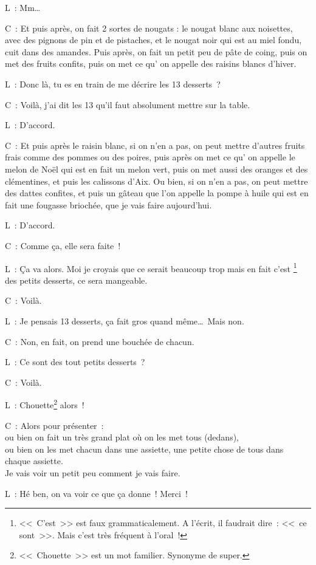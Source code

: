 \documentclass[11pt, french]{report}
\begin{document}
L~: Mm\ldots

C~: Et puis après, on fait 2 sortes de nougats : le nougat blanc aux noisettes,
avec des pignons de pin et de pistaches, et le nougat noir qui est au miel
fondu, cuit dans des amandes. Puis après, on fait un petit peu de pâte de
coing, puis on met des fruits confits, puis on met ce qu’ on appelle des
raisins blancs d’hiver.

L~: Donc là, tu es en train de me décrire les 13 desserts~?

C~: Voilà, j’ai dit les 13 qu’il faut absolument mettre sur la table.

L~: D’accord.

C~: Et puis après le raisin blanc, si on n’en a pas, on peut mettre d’autres
fruits frais comme des pommes ou des poires, puis après on met ce qu’ on
appelle le melon de Noël qui est en fait un melon vert, puis on met aussi des
oranges et des clémentines, et puis les calissons d’Aix. Ou bien, si on n’en
a pas, on peut mettre des dattes confites, et puis un gâteau que l’on appelle
la pompe à huile qui est en fait une fougasse briochée, que je vais faire
aujourd’hui.

L~: D’accord.

C~: Comme ça, elle sera faite~!

L~: Ça va alors. Moi je croyais que ce serait beaucoup trop mais en fait c’est
\footnote{<<~C'est~>> est faux grammaticalement. A l'écrit, il faudrait dire~:
  <<~ce sont~>>. Mais c'est très fréquent à l'oral~!} des petits desserts, ce
sera mangeable.

C~: Voilà.

L~: Je pensais 13 desserts, ça fait gros quand même\ldots\ Mais non.

C~: Non, en fait, on prend une bouchée de chacun.

L~: Ce sont des tout petits desserts~?

C~: Voilà.

L~: Chouette\footnote{<<~Chouette~>> est un mot familier. Synonyme de super.}
alors~!

C~: Alors pour présenter~:\\
ou bien on fait un très grand plat où on les met tous (dedans),\\
ou bien on les met chacun dans une assiette, une petite chose de tous dans
chaque assiette.\\
Je vais voir un petit peu comment je vais faire.

L~: Hé ben, on va voir ce que ça donne~! Merci~!
\end{document}
